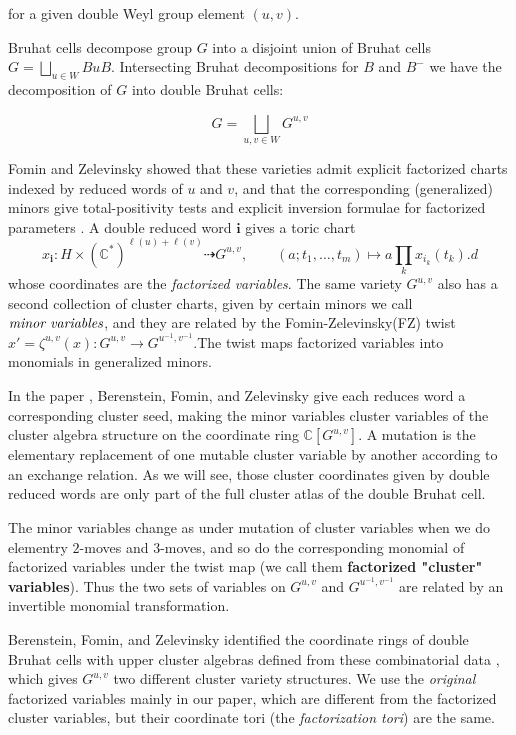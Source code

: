 \documentclass[12pt]{amsart}
\newcommand{\C}{\mathbb C}
\newcommand{\bi}{\mathbf i}
\theoremstyle{plain}
\theoremstyle{definition}
\theoremstyle{remark}
\begin{document}
for a given double Weyl group element $(u,v)$. 

Bruhat cells decompose group $G$ into a disjoint union of Bruhat cells $G=\bigsqcup_{u\in W}BuB$. Intersecting Bruhat decompositions for $B$ and $B^-$ we have the decomposition of $G$ into double Bruhat cells:

$$G=\bigsqcup_{u,v\in W} G^{u,v}$$

Fomin and Zelevinsky showed that these varieties admit explicit factorized charts indexed by reduced words of $u$ and $v$, and that the corresponding (generalized) minors give total-positivity tests and explicit inversion formulae for factorized parameters \cite{FZ99}. A double reduced word $\bi$ gives a toric chart
\[
  x_{\bi}:H\times (\C^*)^{\ell(u)+\ell(v)}\dashrightarrow G^{u,v},
  \qquad (a;t_1,\ldots,t_m)\longmapsto a\prod_k x_{i_k}(t_k).d
\]
whose coordinates are the \emph{factorized variables}.  The same variety $G^{u,v}$ also has a second collection of cluster charts, given by certain minors we call $\emph{minor variables}$, and they are related by the Fomin-Zelevinsky(FZ) twist $x'=\zeta^{u,v}(x): G^{u,v}\to G^{u^{-1},v^{-1}}$.The twist maps factorized variables into monomials in generalized minors. 

In the paper \cite{BFZ05}, Berenstein, Fomin, and Zelevinsky give each reduces word a corresponding cluster seed, making the minor variables cluster variables of the cluster algebra structure on the coordinate ring $\C[G^{u,v}]$. A mutation is the elementary replacement of one mutable cluster variable by another according to an exchange relation.  As we will see, those cluster coordinates given by double reduced words are only part of the full cluster atlas of the double Bruhat cell.

The minor variables change as under mutation of cluster variables when we do elementry $2$-moves and $3$-moves, and so do the corresponding monomial of factorized variables under the twist map (we call them {\bf factorized "cluster" variables}).  Thus the two sets of variables on $G^{u,v}$ and $G^{u^{-1},v^{-1}}$ are related by an invertible monomial transformation. 

Berenstein, Fomin, and Zelevinsky identified the coordinate rings of double Bruhat cells with upper cluster algebras defined from these combinatorial data \cite{BFZ05}, which gives $G^{u,v}$ two different cluster variety structures. We use the \emph{original} factorized variables mainly in our paper, which are different from the factorized cluster variables, but their coordinate tori (the \emph{factorization tori}) are the same.
\end{document}
